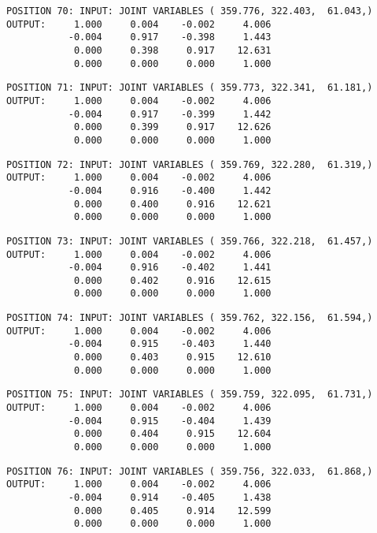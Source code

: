 \begin{verbatim}
POSITION 70: INPUT: JOINT VARIABLES ( 359.776, 322.403,  61.043,)
OUTPUT:     1.000     0.004    -0.002     4.006
           -0.004     0.917    -0.398     1.443
            0.000     0.398     0.917    12.631
            0.000     0.000     0.000     1.000
\end{verbatim} \pagebreak[1]\begin{verbatim}
POSITION 71: INPUT: JOINT VARIABLES ( 359.773, 322.341,  61.181,)
OUTPUT:     1.000     0.004    -0.002     4.006
           -0.004     0.917    -0.399     1.442
            0.000     0.399     0.917    12.626
            0.000     0.000     0.000     1.000
\end{verbatim} \pagebreak[1]\begin{verbatim}
POSITION 72: INPUT: JOINT VARIABLES ( 359.769, 322.280,  61.319,)
OUTPUT:     1.000     0.004    -0.002     4.006
           -0.004     0.916    -0.400     1.442
            0.000     0.400     0.916    12.621
            0.000     0.000     0.000     1.000
\end{verbatim} \pagebreak[1]\begin{verbatim}
POSITION 73: INPUT: JOINT VARIABLES ( 359.766, 322.218,  61.457,)
OUTPUT:     1.000     0.004    -0.002     4.006
           -0.004     0.916    -0.402     1.441
            0.000     0.402     0.916    12.615
            0.000     0.000     0.000     1.000
\end{verbatim} \pagebreak[1]\begin{verbatim}
POSITION 74: INPUT: JOINT VARIABLES ( 359.762, 322.156,  61.594,)
OUTPUT:     1.000     0.004    -0.002     4.006
           -0.004     0.915    -0.403     1.440
            0.000     0.403     0.915    12.610
            0.000     0.000     0.000     1.000
\end{verbatim} \pagebreak[1]\begin{verbatim}
POSITION 75: INPUT: JOINT VARIABLES ( 359.759, 322.095,  61.731,)
OUTPUT:     1.000     0.004    -0.002     4.006
           -0.004     0.915    -0.404     1.439
            0.000     0.404     0.915    12.604
            0.000     0.000     0.000     1.000
\end{verbatim} \pagebreak[1]\begin{verbatim}
POSITION 76: INPUT: JOINT VARIABLES ( 359.756, 322.033,  61.868,)
OUTPUT:     1.000     0.004    -0.002     4.006
           -0.004     0.914    -0.405     1.438
            0.000     0.405     0.914    12.599
            0.000     0.000     0.000     1.000
\end{verbatim} \pagebreak[1]\begin{verbatim}

\end{verbatim}
